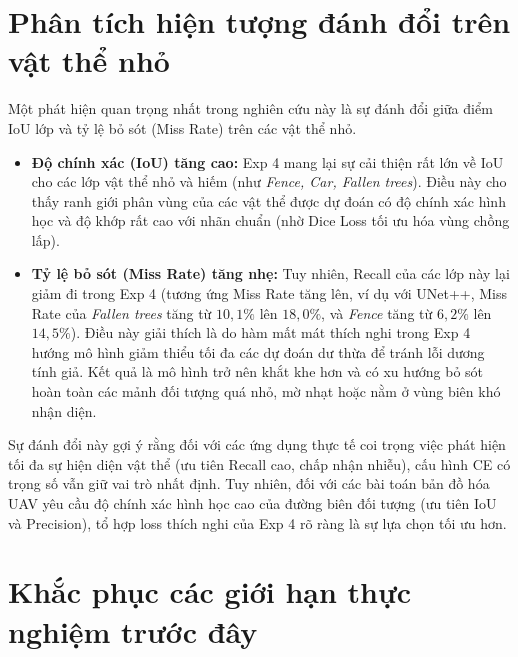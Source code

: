 \section{Phân tích hiện tượng đánh đổi trên vật thể nhỏ}
\label{sec:discussion_tradeoff}

Một phát hiện quan trọng nhất trong nghiên cứu này là sự đánh đổi giữa điểm IoU lớp và tỷ lệ bỏ sót (Miss Rate) trên các vật thể nhỏ. 
\begin{itemize}[leftmargin=1.4cm]
  \item \textbf{Độ chính xác (IoU) tăng cao:} Exp 4 mang lại sự cải thiện rất lớn về IoU cho các lớp vật thể nhỏ và hiếm (như \textit{Fence, Car, Fallen trees}). Điều này cho thấy ranh giới phân vùng của các vật thể được dự đoán có độ chính xác hình học và độ khớp rất cao với nhãn chuẩn (nhờ Dice Loss tối ưu hóa vùng chồng lấp).
  \item \textbf{Tỷ lệ bỏ sót (Miss Rate) tăng nhẹ:} Tuy nhiên, Recall của các lớp này lại giảm đi trong Exp 4 (tương ứng Miss Rate tăng lên, ví dụ với UNet++, Miss Rate của \textit{Fallen trees} tăng từ $10,1\%$ lên $18,0\%$, và \textit{Fence} tăng từ $6,2\%$ lên $14,5\%$). Điều này giải thích là do hàm mất mát thích nghi trong Exp 4 hướng mô hình giảm thiểu tối đa các dự đoán dư thừa để tránh lỗi dương tính giả. Kết quả là mô hình trở nên khắt khe hơn và có xu hướng bỏ sót hoàn toàn các mảnh đối tượng quá nhỏ, mờ nhạt hoặc nằm ở vùng biên khó nhận diện.
\end{itemize}
Sự đánh đổi này gợi ý rằng đối với các ứng dụng thực tế coi trọng việc phát hiện tối đa sự hiện diện vật thể (ưu tiên Recall cao, chấp nhận nhiễu), cấu hình CE có trọng số vẫn giữ vai trò nhất định. Tuy nhiên, đối với các bài toán bản đồ hóa UAV yêu cầu độ chính xác hình học cao của đường biên đối tượng (ưu tiên IoU và Precision), tổ hợp loss thích nghi của Exp 4 rõ ràng là sự lựa chọn tối ưu hơn.

\section{Khắc phục các giới hạn thực nghiệm trước đây}

